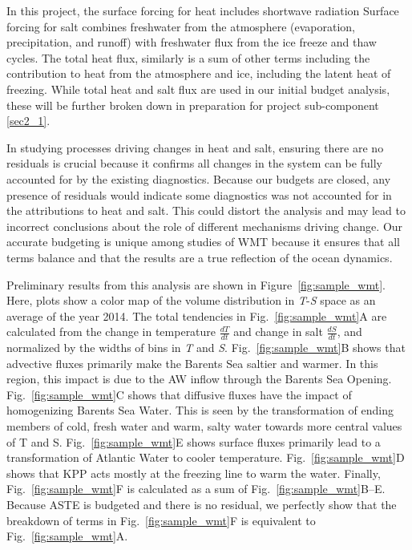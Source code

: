 \documentclass[a4paper,12pt]{article}
\begin{document}

    In this project, the surface forcing for heat includes shortwave radiation
    Surface forcing for salt combines freshwater from the atmosphere (evaporation, precipitation, and runoff) with freshwater flux from the ice freeze and thaw cycles. The total heat flux, similarly is a sum of other terms including the contribution to heat from the atmosphere and ice, including the latent heat of freezing. While total heat and salt flux are used in our initial budget analysis, these will be further broken down in preparation for project sub-component \ref{sec2_1}.

    
    In studying processes driving changes in heat and salt, ensuring there are no residuals is crucial because it confirms all changes in the system can be fully accounted for by the existing diagnostics. Because our budgets are closed, any presence of residuals would indicate some diagnostics was not accounted for in the attributions to heat and salt. This could distort the analysis and may lead to incorrect conclusions about the role of different mechanisms driving change. Our accurate budgeting is unique among studies of WMT because it ensures that all terms balance and that the results are a true reflection of the ocean dynamics.

    

    Preliminary results from this analysis are shown in Figure~\ref{fig:sample_wmt}. Here, plots show a color map of the volume distribution in \emph{T}-\emph{S} space as an average of the year 2014. The total tendencies in Fig.~\ref{fig:sample_wmt}A are calculated from the change in temperature $\frac{dT}{dt}$ and change in salt $\frac{dS}{dt}$, and normalized by the widths of bins in \emph{T} and \emph{S}. Fig.~\ref{fig:sample_wmt}B shows that advective fluxes primarily make the Barents Sea saltier and warmer. In this region, this impact is due to the AW inflow through the Barents Sea Opening. Fig.~\ref{fig:sample_wmt}C shows that diffusive fluxes have the impact of homogenizing Barents Sea Water. This is seen by the transformation of ending members of cold, fresh water and warm, salty water towards more central values of T and S. Fig.~\ref{fig:sample_wmt}E shows surface fluxes primarily lead to a transformation of Atlantic Water to cooler temperature. Fig.~\ref{fig:sample_wmt}D shows that KPP acts mostly at the freezing line to warm the water. Finally, Fig.~\ref{fig:sample_wmt}F is calculated as a sum of Fig.~\ref{fig:sample_wmt}B--E. Because ASTE is budgeted and there is no residual, we perfectly show that the breakdown of terms in Fig.~\ref{fig:sample_wmt}F is equivalent to Fig.~\ref{fig:sample_wmt}A.
\end{document}
